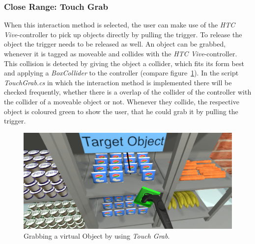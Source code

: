 \subsubsection{Close Range: Touch Grab} \label{sec:TouchGrab}
When this interaction method is selected, the user can make use of the \textit{HTC Vive}-controller to pick up objects directly by pulling the trigger. To release the object the trigger needs to be released as well. An object can be grabbed, whenever it is tagged as moveable and collides with the \textit{HTC Vive}-controller. This collision is detected by giving the object a collider, which fits its form best \cite{website:BoxCollider}\cite{website:SphereCollider} and applying a \textit{BoxCollider} to the controller (compare figure~\ref{fig:touchGrab}). In the script \textit{TouchGrab.cs} in which the interaction method is implemented there will be checked frequently, whether there is a overlap of the collider of the controller with the collider of a moveable object or not. Whenever they collide, the respective object is coloured green to show the user, that he could grab it by pulling the trigger. 

\begin{figure}[H] 
	\center 
	\includegraphics[width=12cm]{Images/TouchGrab.PNG}			
	\caption[Grabbing a virtual Object by using \textit{Touch Grab}.]{Grabbing a virtual Object by using \textit{Touch Grab}.}
	\label{fig:touchGrab}
\end{figure}

